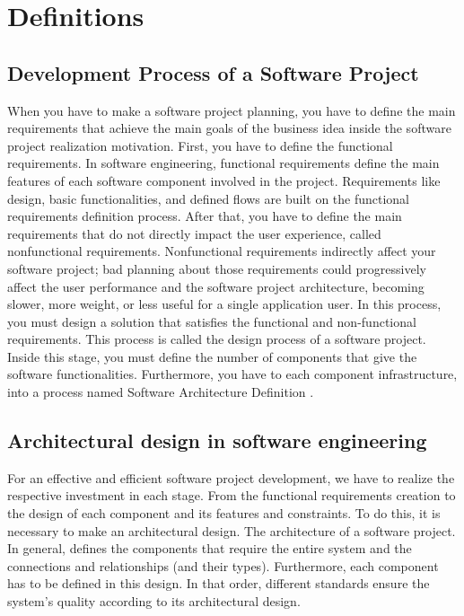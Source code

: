 
\chapter{Definitions}
\label{cha:definitions}

\section{Development Process of a Software Project}
When you have to make a software project planning, you have to define the main requirements that achieve the main goals of the business idea inside the software project realization motivation. First, you have to define the functional requirements. In software engineering, functional requirements define the main features of each software component involved in the project. Requirements like design, basic functionalities, and defined flows are built on the functional requirements definition process.
After that, you have to define the main requirements that do not directly impact the user experience, called nonfunctional requirements. Nonfunctional requirements indirectly affect your software project; bad planning about those requirements could progressively affect the user performance and the software project architecture, becoming slower, more weight, or less useful for a single application user. In this process, you must design a solution that satisfies the functional and non-functional requirements. This process is called the design process of a software project. Inside this stage, you must define the number of components that give the software functionalities. Furthermore, you have to each component infrastructure, into a process named Software Architecture Definition \citet{software-engineering-book}.  

\section{Architectural design in software engineering}
For an effective and efficient software project development, we have to realize the respective investment in each stage. From the functional requirements creation to the design of each component and its features and constraints. To do this, it is necessary to make an architectural design. The architecture of a software project. In general, defines the components that require the entire system and the connections and relationships (and their types). Furthermore, each component has to be defined in this design. In that order, different standards ensure the system’s quality according to its architectural design.

